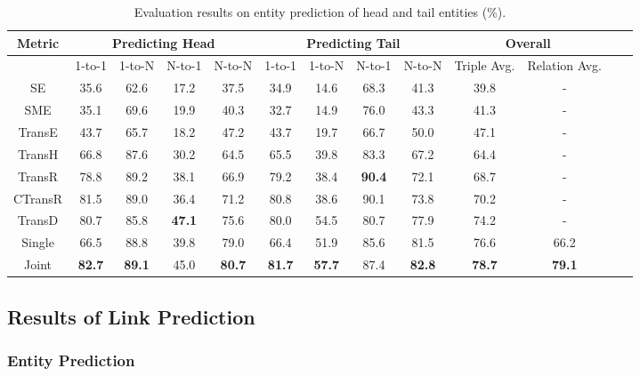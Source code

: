 \documentclass[11pt,a4paper]{article}
\begin{document}
\begin{table}[t]
\centering
\scriptsize
\begin{tabular}{|c|c|c|c|c|c|c|c|c|c|c|c|c|}
\hline
Metric            & \multicolumn{4}{c|}{Predicting Head} & \multicolumn{4}{c|}{Predicting Tail} & \multicolumn{2}{c|}{Overall} \\ \hline
                  & 1-to-1     & 1-to-N    & N-to-1    & N-to-N    & 1-to-1     & 1-to-N    & N-to-1    & N-to-N  & Triple Avg. & Relation Avg. \\ \hline

SE &35.6 &62.6 &17.2 &37.5 &34.9 &14.6 &68.3 &41.3 &39.8 & - \\ \hline
SME &35.1 &69.6 &19.9 &40.3 &32.7 &14.9 &76.0 &43.3 &41.3 & - \\ \hline
TransE            & 43.7       & 65.7      & 18.2      & 47.2      & 43.7       & 19.7      & 66.7      & 50.0    & 47.1 & - \\ \hline
TransH     & 66.8       & 87.6      & 30.2      & 64.5      & 65.5       & 39.8      & 83.3      & 67.2    & 64.4 & - \\ \hline
TransR     & 78.8       & 89.2      & 38.1      & 66.9      & 79.2       & 38.4      &\textbf{90.4}      & 72.1    & 68.7 & - \\ \hline
CTransR     & 81.5      & 89.0      & 36.4      & 71.2      & 80.8       & 38.6      &90.1      & 73.8    & 70.2 & - \\ \hline

TransD  &80.7  &85.8  &\textbf{47.1} &75.6  &80.0 &54.5 &80.7 &77.9  &74.2 &- \\ \hline


Single      & 66.5       & 88.8      & 39.8      & 79.0      & 66.4       & 51.9      & 85.6      & 81.5    & 76.6 & 66.2 \\ \hline
Joint             & \textbf{82.7}& \textbf{89.1} &45.0 & \textbf{80.7}& \textbf{81.7}& \textbf{57.7}& 87.4&\textbf{82.8} & \textbf{78.7} & \textbf{79.1} \\ \hline
\end{tabular}
\caption{Evaluation results on entity prediction of head and tail entities (\%).}
\label{t:entity}
\end{table}


\subsection{Results of Link Prediction}

\subsubsection{Entity Prediction}
\end{document}
